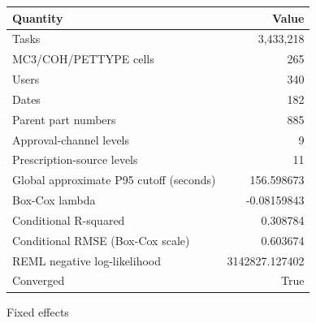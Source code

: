 \documentclass[
]{article}
\newcounter{none} %
\begin{document}
{\def\LTcaptype{none} %
\begin{longtable}[]{@{}lr@{}}
\toprule\noalign{}
Quantity & Value \\
\midrule\noalign{}
\endhead
\bottomrule\noalign{}
\endlastfoot
Tasks & 3,433,218 \\
MC3/COH/PETTYPE cells & 265 \\
Users & 340 \\
Dates & 182 \\
Parent part numbers & 885 \\
Approval-channel levels & 9 \\
Prescription-source levels & 11 \\
Global approximate P95 cutoff (seconds) & 156.598673 \\
Box-Cox lambda & -0.08159843 \\
Conditional R-squared & 0.308784 \\
Conditional RMSE (Box-Cox scale) & 0.603674 \\
REML negative log-likelihood & 3142827.127402 \\
Converged & True \\
\end{longtable}
}

Fixed effects
\end{document}

